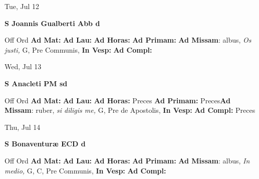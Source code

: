 \documentclass[10pt]{book}
\begin{document}
\begin{center}
\begin{minipage}{3.5in}
\vspace{2em}
\begin{center}Tue, Jul 12
\end{center}
\textbf{ \large S Joannis Gualberti Abb
\textnormal{\normalsize d}}

\begin{justify}Off Ord
\textbf{Ad Mat: }
\textbf{Ad Lau: }
\textbf{Ad Horas: }
\textbf{Ad Primam: }\textbf{Ad Missam}: albus, \textit{Os justi,} G, Pre Communis, 
\textbf{In Vesp: }
\textbf{Ad Compl: }
\end{justify}
\end{minipage}
\end{center}

\begin{center}
\begin{minipage}{3.5in}
\vspace{2em}
\begin{center}Wed, Jul 13
\end{center}
\textbf{ \large S Anacleti PM
\textnormal{\normalsize sd}}

\begin{justify}Off Ord
\textbf{Ad Mat: }
\textbf{Ad Lau: }
\textbf{Ad Horas: }Preces
\textbf{Ad Primam: }Preces\textbf{Ad Missam}: ruber, \textit{si diligis me,} G, Pre de Apostolis, 
\textbf{In Vesp: }
\textbf{Ad Compl: }Preces
\end{justify}
\end{minipage}
\end{center}

\begin{center}
\begin{minipage}{3.5in}
\vspace{2em}
\begin{center}Thu, Jul 14
\end{center}
\textbf{ \large S Bonaventuræ ECD
\textnormal{\normalsize d}}

\begin{justify}Off Ord
\textbf{Ad Mat: }
\textbf{Ad Lau: }
\textbf{Ad Horas: }
\textbf{Ad Primam: }\textbf{Ad Missam}: albus, \textit{In medio,} G, C, Pre Communis, 
\textbf{In Vesp: }
\textbf{Ad Compl: }
\end{justify}
\end{minipage}
\end{center}
\end{document}
